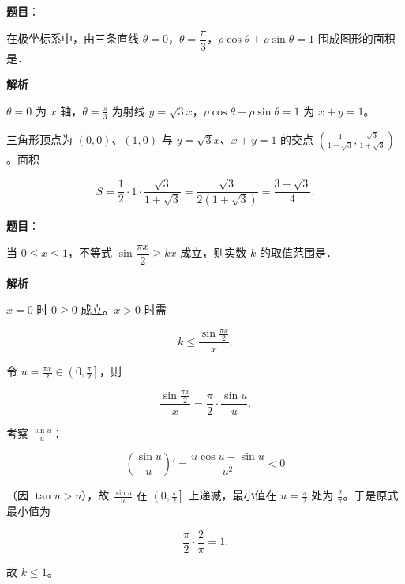 \begin{answer}

\textbf{题目}：

在极坐标系中，由三条直线 $\theta=0$，$\theta=\dfrac{\pi}{3}$，$\rho\cos\theta+\rho\sin\theta=1$ 围成图形的面积是\gkblank{}．

\textbf{解析}

$\theta=0$ 为 $x$ 轴，$\theta=\frac\pi3$ 为射线 $y=\sqrt3x$，$\rho\cos\theta+\rho\sin\theta=1$ 为 $x+y=1$。

三角形顶点为 $(0,0)$、$(1,0)$ 与 $y=\sqrt3x$、$x+y=1$ 的交点 $\left(\frac{1}{1+\sqrt3},\frac{\sqrt3}{1+\sqrt3}\right)$。面积

\nopagebreak[4]
\[S=\frac12\cdot1\cdot\frac{\sqrt3}{1+\sqrt3}=\frac{\sqrt3}{2(1+\sqrt3)}=\frac{3-\sqrt3}{4}.\]


\end{answer}
\begin{answer}

\textbf{题目}：

当 $0\leqslant x\leqslant1$，不等式 $\sin\dfrac{\pi x}{2}\geqslant kx$ 成立，则实数 $k$ 的取值范围是\gkblank{}．

\textbf{解析}

$x=0$ 时 $0\geqslant0$ 成立。$x>0$ 时需

\nopagebreak[4]
\[k\leqslant\frac{\sin\frac{\pi x}{2}}{x}.\]

令 $u=\frac{\pi x}{2}\in\left(0,\frac\pi2\right]$，则

\nopagebreak[4]
\[\frac{\sin\frac{\pi x}{2}}{x}=\frac\pi2\cdot\frac{\sin u}{u}.\]

考察 $\frac{\sin u}{u}$：

\nopagebreak[4]
\[\left(\frac{\sin u}{u}\right)'=\frac{u\cos u-\sin u}{u^2}<0\]

（因 $\tan u>u$），故 $\frac{\sin u}{u}$ 在 $\left(0,\frac\pi2\right]$ 上递减，最小值在 $u=\frac\pi2$ 处为 $\frac{2}{\pi}$。于是原式最小值为

\nopagebreak[4]
\[\frac\pi2\cdot\frac2\pi=1 .\]

故 $k\leqslant1$。


\end{answer}
